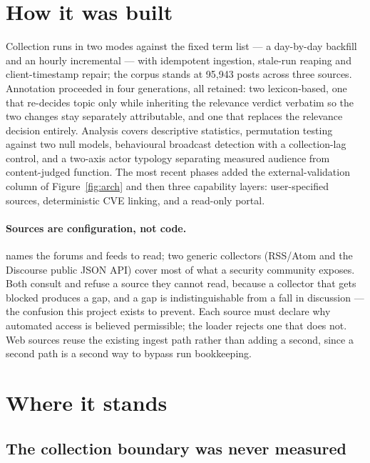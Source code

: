 \documentclass[11pt]{article}
\begin{document}
\section*{\color{accent}How it was built}

Collection runs in two modes against the fixed term list --- a day-by-day
backfill and an hourly incremental --- with idempotent ingestion, stale-run
reaping and client-timestamp repair; the corpus stands at 95{,}943 posts across
three sources. Annotation proceeded in four generations,
all retained: two lexicon-based, one that re-decides topic only while
inheriting the relevance verdict verbatim so the two changes stay separately
attributable, and one that replaces the relevance decision entirely. Analysis
covers descriptive statistics, permutation testing against two null models,
behavioural broadcast detection with a collection-lag control, and a two-axis
actor typology separating measured audience from content-judged function. The
most recent phases added the external-validation column of
Figure~\ref{fig:arch} and then three capability layers: user-specified sources,
deterministic CVE linking, and a read-only portal.

\paragraph{Sources are configuration, not code.}
 names the forums and feeds to read; two generic
collectors (RSS\slash Atom and the Discourse public JSON API) cover most of what
a security community exposes. Both consult  and refuse a source
they cannot read, because a collector that gets blocked produces a gap, and a
gap is indistinguishable from a fall in discussion --- the confusion this project
exists to prevent. Each source must declare why automated access is believed
permissible; the loader rejects one that does not. Web sources reuse the
existing ingest path rather than adding a second, since a second path is a
second way to bypass run bookkeeping.

\section*{\color{accent}Where it stands}

\subsection*{The collection boundary was never measured}
\end{document}
